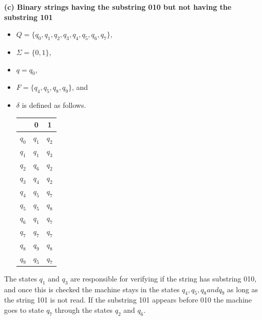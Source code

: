 \documentclass[11pt]{article}
\renewcommand{\part}[1] {{\vspace{0.15in}\noindent\textbf (#1)} \vspace{0.10in}}
\begin{document}
\textbf{\part{c} Binary strings having the substring 010 but not having the substring 101}
\begin{itemize}
	\item $Q = \{q_0, q_1, q_2, q_3, q_4, q_5, q_6, q_7\}$,	
	\item $\Sigma = \{0,1\}$,
	\item $q = q_0$,
	\item $F = \{q_4, q_5, q_8, q_9\}$, and
        \item $\delta$ is defined as follows.

\begin{tabular}{|c||c|c|}  \hline
      & 0 & 1 \\ \hline 
      $q_0$ & $q_1$ & $q_2$ \\ \hline 
      $q_1$ & $q_1$ & $q_3$ \\ \hline
      $q_2$ & $q_6$ & $q_2$ \\ \hline
      $q_3$ & $q_4$ & $q_2$ \\ \hline 
      $q_4$ & $q_5$ & $q_7$ \\ \hline 
      $q_5$ & $q_5$ & $q_8$ \\ \hline 
      $q_6$ & $q_1$ & $q_7$ \\ \hline 
      $q_7$ & $q_7$ & $q_7$ \\ \hline 
      $q_8$ & $q_9$ & $q_8$ \\ \hline 
      $q_9$ & $q_5$ & $q_7$ \\ \hline 
\end{tabular}
\end{itemize}
The states $q_1$ and $q_3$ are responsible for verifying if the string has substring 010, and once this is checked the machine stays in the states $q_4, q_5, q_8 and q_9$ as long as the string 101 is not read. If the substring 101 appears before 010 the machine goes to state $q_7$ through the states $q_2$ and $q_6$.
\begin{figure}[h]
\centering
{}
\end{figure}
\end{document}
